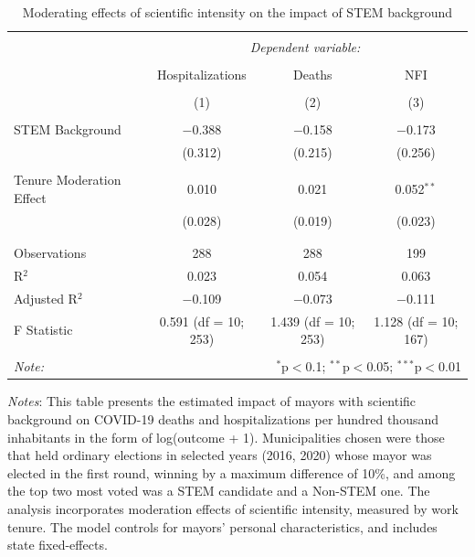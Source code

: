 \documentclass[
  letterpaper,
  DIV=11,
  numbers=noendperiod]{scrartcl}
\begin{document}
\begin{table}[!htbp] \centering 
  \caption{Moderating effects of scientific intensity on the impact of STEM background} 
  \label{} 
\begin{tabular}{@{\extracolsep{5pt}}lccc} 
\\[-1.8ex]\hline 
\hline \\[-1.8ex] 
 & \multicolumn{3}{c}{\textit{Dependent variable:}} \\ 
\cline{2-4} 
\\[-1.8ex] & Hospitalizations & Deaths & NFI \\ 
\\[-1.8ex] & (1) & (2) & (3)\\ 
\hline \\[-1.8ex] 
 STEM Background & $-$0.388 & $-$0.158 & $-$0.173 \\ 
  & (0.312) & (0.215) & (0.256) \\ 
  & & & \\ 
 Tenure Moderation Effect & 0.010 & 0.021 & 0.052$^{**}$ \\ 
  & (0.028) & (0.019) & (0.023) \\ 
  & & & \\ 
\hline \\[-1.8ex] 
Observations & 288 & 288 & 199 \\ 
R$^{2}$ & 0.023 & 0.054 & 0.063 \\ 
Adjusted R$^{2}$ & $-$0.109 & $-$0.073 & $-$0.111 \\ 
F Statistic & 0.591 (df = 10; 253) & 1.439 (df = 10; 253) & 1.128 (df = 10; 167) \\ 
\hline 
\hline \\[-1.8ex] 
\textit{Note:}  & \multicolumn{3}{r}{$^{*}$p$<$0.1; $^{**}$p$<$0.05; $^{***}$p$<$0.01} \\ 
\end{tabular} 
\end{table}

\emph{Notes}: This table presents the estimated impact of mayors with
scientific background on COVID-19 deaths and hospitalizations per
hundred thousand inhabitants in the form of log(outcome + 1).
Municipalities chosen were those that held ordinary elections in
selected years (2016, 2020) whose mayor was elected in the first round,
winning by a maximum difference of 10\%, and among the top two most
voted was a STEM candidate and a Non-STEM one. The analysis incorporates
moderation effects of scientific intensity, measured by work tenure. The
model controls for mayors' personal characteristics, and includes state
fixed-effects.
\end{document}
